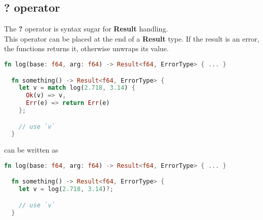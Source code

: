 \documentclass{article}
\begin{document}
\pagebreak

\subsection{? operator}

The \textbf{?} operator is syntax sugar for \textbf{Result} handling. \\
This operator can be placed at the end of a \textbf{Result} type.
If the result is an error, the functions returns it, otherwise unwraps
its value.

\begin{lstlisting}[language=Rust, style=boxed, numbers=none]
  fn log(base: f64, arg: f64) -> Result<f64, ErrorType> { ... }

  fn something() -> Result<f64, ErrorType> {
    let v = match log(2.718, 3.14) {
      Ok(v) => v,
      Err(e) => return Err(e)
    };

    // use `v`
  }
\end{lstlisting}

can be written as

\begin{lstlisting}[language=Rust, style=boxed, numbers=none]
  fn log(base: f64, arg: f64) -> Result<f64, ErrorType> { ... }

  fn something() -> Result<f64, ErrorType> {
    let v = log(2.718, 3.14)?;

    // use `v`
  }
\end{lstlisting}
\end{document}
